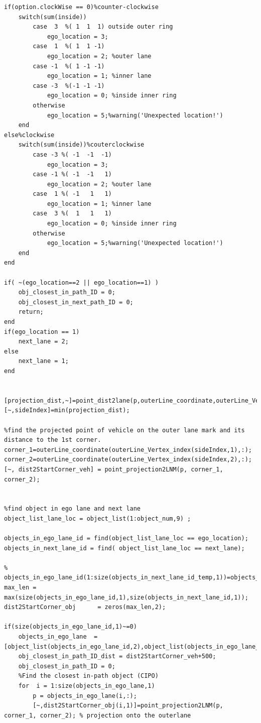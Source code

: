 \documentclass[12pt,a4paper]{article}
\begin{document}
{{{\begin{verbatim}
if(option.clockWise == 0)%counter-clockwise
    switch(sum(inside))
        case  3  %( 1  1  1) outside outer ring
            ego_location = 3; 
        case  1  %( 1  1 -1)
            ego_location = 2; %outer lane 
        case -1  %( 1 -1 -1)
            ego_location = 1; %inner lane
        case -3  %(-1 -1 -1)
            ego_location = 0; %inside inner ring
        otherwise
            ego_location = 5;%warning('Unexpected location!')
    end
else%clockwise
    switch(sum(inside))%couterclockwise
        case -3 %( -1  -1  -1)
            ego_location = 3; 
        case -1 %( -1  -1   1)
            ego_location = 2; %outer lane 
        case  1 %( -1   1   1)
            ego_location = 1; %inner lane
        case  3 %(  1   1   1)
            ego_location = 0; %inside inner ring
        otherwise
            ego_location = 5;%warning('Unexpected location!')
    end
end

if( ~(ego_location==2 || ego_location==1) ) 
    obj_closest_in_path_ID = 0;
    obj_closest_in_next_path_ID = 0;
    return;
end
if(ego_location == 1)
    next_lane = 2;
else
    next_lane = 1;
end  


[projection_dist,~]=point_dist2lane(p,outerLine_coordinate,outerLine_Vertex_index);
[~,sideIndex]=min(projection_dist);

%find the projected point of vehicle on the outer lane mark and its distance to the 1st corner.
corner_1=outerLine_coordinate(outerLine_Vertex_index(sideIndex,1),:);
corner_2=outerLine_coordinate(outerLine_Vertex_index(sideIndex,2),:);
[~, dist2StartCorner_veh] = point_projection2LNM(p, corner_1, corner_2);


%find object in ego lane and next lane
object_list_lane_loc = object_list(1:object_num,9) ;

objects_in_ego_lane_id = find(object_list_lane_loc == ego_location);
objects_in_next_lane_id = find( object_list_lane_loc == next_lane);

% objects_in_ego_lane_id(1:size(objects_in_next_lane_id_temp,1))=objects_in_ego_lane_id_temp;
max_len = max(size(objects_in_ego_lane_id,1),size(objects_in_next_lane_id,1));
dist2StartCorner_obj      = zeros(max_len,2);

if(size(objects_in_ego_lane_id,1)~=0)
    objects_in_ego_lane  =  [object_list(objects_in_ego_lane_id,2),object_list(objects_in_ego_lane_id,4)];
    obj_closest_in_path_ID_dist = dist2StartCorner_veh+500;
    obj_closest_in_path_ID = 0;
    %Find the closest in-path object (CIPO)
    for  i = 1:size(objects_in_ego_lane,1)
        p = objects_in_ego_lane(i,:);
        [~,dist2StartCorner_obj(i,1)]=point_projection2LNM(p, corner_1, corner_2); % projection onto the outerlane 


\end{verbatim}}}}
\end{document}
